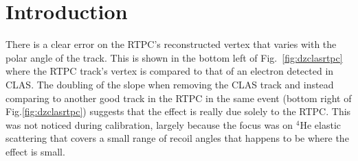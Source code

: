 \documentclass[amsmath,amssymb,notitlepage,11pt]{revtex4-1}
\begin{document}
\section{Introduction}
There is a clear error on the RTPC's reconstructed vertex that varies with the polar angle of the track.  This is shown in the bottom left of Fig.~\ref{fig:dzclasrtpc} where the RTPC track's vertex is compared to that of an electron detected in CLAS.
The doubling of the slope when removing the CLAS track and instead comparing to another good track in the RTPC in the same event (bottom right of Fig.\ref{fig:dzclasrtpc}) suggests that the effect is really due solely to the RTPC.
This was not noticed during calibration, largely because the focus was on $^4$He elastic scattering that covers a small range of recoil angles that happens to be where the effect is small.
\end{document}
